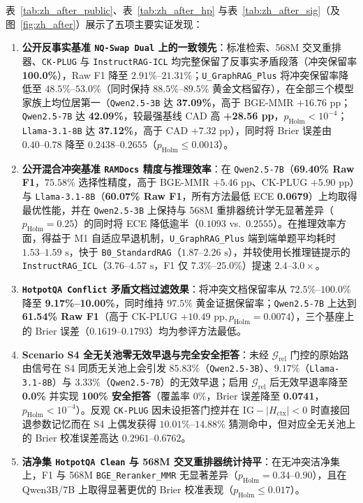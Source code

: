 \documentclass[11pt]{article}
\begin{document}
表~\ref{tab:zh_after_public}、表~\ref{tab:zh_after_hp} 与表~\ref{tab:zh_after_sig}（及图~\ref{fig:zh_after}）展示了五项主要实证发现：
\begin{enumerate}[leftmargin=*,nosep]
    \item \textbf{公开反事实基准 \texttt{NQ-Swap Dual} 上的一致领先}：标准检索、568M 交叉重排器、\texttt{CK-PLUG} 与 \texttt{InstructRAG-ICL} 均完整保留了反事实矛盾段落（冲突保留率 \textbf{100.0\%}），Raw F1 降至 $2.91\%\text{--}21.31\%$；\texttt{U\_GraphRAG\_Plus} 将冲突保留率降低至 $48.5\%\text{--}53.0\%$（同时保持 $88.5\%\text{--}89.5\%$ 黄金文档留存），在全部三个模型家族上均位居第一（\texttt{Qwen2.5-3B} 达 \textbf{37.09\%}，高于 BGE-MMR $+16.76\text{ pp}$；\texttt{Qwen2.5-7B} 达 \textbf{42.09\%}，较最强基线 CAD 高 \textbf{+28.56 pp}，$p_{\text{Holm}}<10^{-4}$；\texttt{Llama-3.1-8B} 达 \textbf{37.12\%}，高于 CAD $+7.32\text{ pp}$），同时将 Brier 误差由 $0.40\text{--}0.78$ 降至 $0.2438\text{--}0.2655$（$p_{\text{Holm}}\le 0.0013$）。
    \item \textbf{公开混合冲突基准 \texttt{RAMDocs} 精度与推理效率}：在 \texttt{Qwen2.5-7B}（\textbf{69.40\% Raw F1}，$75.58\%$ 选择性精度，高于 BGE-MMR $+5.46\text{ pp}$、CK-PLUG $+5.90\text{ pp}$）与 \texttt{Llama-3.1-8B}（\textbf{60.07\% Raw F1}，所有方法最低 ECE \textbf{0.0679}）上均取得最优性能，并在 \texttt{Qwen2.5-3B} 上保持与 568M 重排器统计学无显著差异（$p_{\text{Holm}}=0.25$）的同时将 ECE 降低逾半（$0.1093$ vs.\ $0.2555$）。在推理效率方面，得益于 M1 自适应早退机制，\texttt{U\_GraphRAG\_Plus} 端到端单题平均耗时 $1.53\text{--}1.59\text{ s}$，快于 \texttt{B0\_StandardRAG}（$1.87\text{--}2.26\text{ s}$），并较使用长推理链提示的 \texttt{InstructRAG\_ICL}（$3.76\text{--}4.57\text{ s}$，F1 仅 $7.3\%\text{--}25.0\%$）提速 $2.4\text{--}3.0\times$。
    \item \textbf{\texttt{HotpotQA Conflict} 矛盾文档过滤效果}：将冲突文档保留率从 $72.5\%\text{--}100.0\%$ 降至 \textbf{9.17\%--10.00\%}，同时维持 $97.5\%$ 黄金证据保留率；\texttt{Qwen2.5-7B} 上达到 \textbf{61.54\% Raw F1}（高于 CK-PLUG $+10.49\text{ pp}, p_{\text{Holm}}=0.0074$），三个基座上的 Brier 误差（$0.1619\text{--}0.1793$）均为参评方法最低。
    \item \textbf{Scenario S4 全无关池零无效早退与完全安全拒答}：未经 $\mathcal{G}_{\text{rel}}$ 门控的原始路由信号在 S4 同质无关池上会引发 $85.83\%$（\texttt{Qwen2.5-3B}）、$9.17\%$（\texttt{Llama-3.1-8B}）与 $3.33\%$（\texttt{Qwen2.5-7B}）的无效早退；启用 $\mathcal{G}_{\text{rel}}$ 后无效早退率降至 \textbf{0.0\%} 并实现 \textbf{100\% 安全拒答}（覆盖率 $0\%$，Brier 误差降至 \textbf{0.0741}，$p_{\text{Holm}}<10^{-4}$）。反观 \texttt{CK-PLUG} 因未设拒答门控并在 $\text{IG} - |H_{\text{ctx}}| < 0$ 时直接回退参数记忆而在 S4 上偶发获得 $10.01\%\text{--}14.88\%$ 猜测命中，但对应全无关池上的 Brier 校准误差高达 $0.2961\text{--}0.6762$。
    \item \textbf{洁净集 \texttt{HotpotQA Clean} 与 568M 交叉重排器统计持平}：在无冲突洁净集上，F1 与 568M \texttt{BGE\_Reranker\_MMR} 无显著差异（$p_{\text{Holm}}=0.34\text{--}0.90$），且在 Qwen3B/7B 上取得显著更优的 Brier 校准表现（$p_{\text{Holm}}\le 0.017$）。
\end{enumerate}
\end{document}
